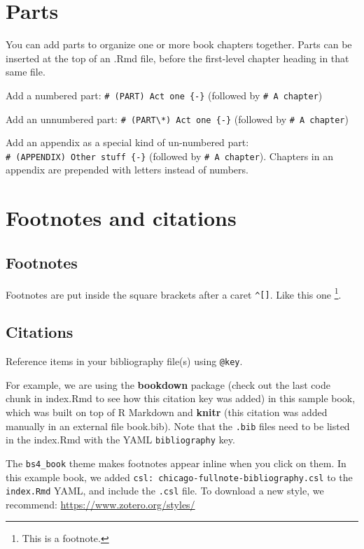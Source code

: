 \documentclass[
]{book}
\theoremstyle{definition}
\theoremstyle{definition}
\theoremstyle{definition}
\theoremstyle{definition}
\theoremstyle{remark}
\begin{document}
\chapter{Parts}\label{parts}

You can add parts to organize one or more book chapters together. Parts can be inserted at the top of an .Rmd file, before the first-level chapter heading in that same file.

Add a numbered part: \texttt{\#\ (PART)\ Act\ one\ \{-\}} (followed by \texttt{\#\ A\ chapter})

Add an unnumbered part: \texttt{\#\ (PART\textbackslash{}*)\ Act\ one\ \{-\}} (followed by \texttt{\#\ A\ chapter})

Add an appendix as a special kind of un-numbered part: \texttt{\#\ (APPENDIX)\ Other\ stuff\ \{-\}} (followed by \texttt{\#\ A\ chapter}). Chapters in an appendix are prepended with letters instead of numbers.

\chapter{Footnotes and citations}\label{footnotes-and-citations}

\section{Footnotes}\label{footnotes}

Footnotes are put inside the square brackets after a caret \texttt{\^{}{[}{]}}. Like this one \footnote{This is a footnote.}.

\section{Citations}\label{citations}

Reference items in your bibliography file(s) using \texttt{@key}.

For example, we are using the \textbf{bookdown} package \citep{R-bookdown} (check out the last code chunk in index.Rmd to see how this citation key was added) in this sample book, which was built on top of R Markdown and \textbf{knitr} \citep{xie2015} (this citation was added manually in an external file book.bib).
Note that the \texttt{.bib} files need to be listed in the index.Rmd with the YAML \texttt{bibliography} key.

The \texttt{bs4\_book} theme makes footnotes appear inline when you click on them. In this example book, we added \texttt{csl:\ chicago-fullnote-bibliography.csl} to the \texttt{index.Rmd} YAML, and include the \texttt{.csl} file. To download a new style, we recommend: \url{https://www.zotero.org/styles/}
\end{document}
